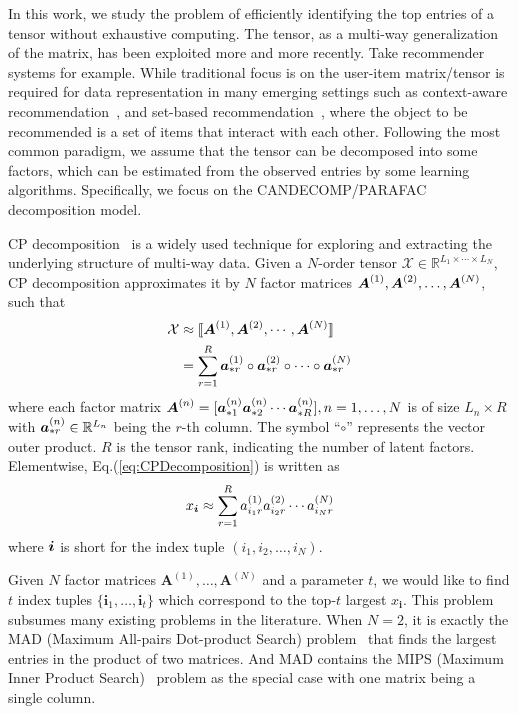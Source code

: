 \documentclass[letterpaper]{article}
\newcommand{\Sca}[3]{{#1}^{(#2)}_{i_#2#3}}%
\newcommand{\anr}[2]{\Sca{a}{#1}{#2}}
\newcommand{\T}[1]{\mathcal{#1}}
\newcommand{\KT}[1]{\llbracket #1 \rrbracket}
\newcommand{\V}[1]{{\boldsymbol{{\MakeLowercase{#1}}}}}
\newcommand{\ColVec}[3]{\V{#1}^{(#2)}_{#3}}
\newcommand{\ColVecA}[1]{\V{a}^{(#1)}_{*r}}
\newcommand{\M}[1]{{\boldsymbol{{\MakeUppercase{#1}}}}}
\newcommand{\FacMat}[2]{\M{#1}^{(#2)}}
\newcommand{\Eqn}[1]{Eq.(\ref{eq:#1})}
\begin{document}
In this work, 
we study the problem of efficiently identifying the top entries of a tensor 
without exhaustive computing. 
The tensor, as a multi-way generalization of the matrix, 
has been exploited more and more recently. 
Take recommender systems for example. 
While traditional focus is on the user-item matrix/tensor 
is required for data representation in many emerging settings 
such as context-aware recommendation~\cite{Rendle_PITF,KoYe09}, 
and set-based recommendation~\cite{HuYiLa15},
where the object to be recommended is a set of items that interact with each other. 
Following the most common paradigm, we assume that the tensor can be decomposed into some factors, 
which can be estimated from the observed entries by some learning algorithms. 
Specifically, we focus on the CANDECOMP/PARAFAC decomposition model.

CP decomposition~\cite{KoBa09} is a widely used technique for exploring and 
extracting the underlying structure of multi-way data. 
Given a $N$-order tensor $\T{X}\in\mathbb{R}^{L_1\times \cdots\times L_N}$, 
CP decomposition approximates it by $N$ factor matrices $\FacMat{A}{1},\FacMat{A}{2},\ldots,\FacMat{A}{N}$, 
such that
\begin{align}
\label{eq:CPDecomposition}
\T{X}&\approx\KT{\FacMat{A}{1},\FacMat{A}{2},\cdots,\FacMat{A}{N}} \\ \notag
&=\sum_{r=1}^R\ColVecA{1}\circ\ColVecA{2}\circ\cdots\circ\ColVecA{N}
\end{align}
where each factor matrix 
$\FacMat{A}{n}=[\ColVec{a}{n}{*1}\ColVec{a}{n}{*2}\cdots\ColVec{a}{n}{*R}], n=1,\ldots,N$
is of size $L_n\times R$ with $\ColVec{a}{n}{*r}\in\mathbb{R}^{L_n}$ 
being the $r$-th column.
The symbol ``$\circ$'' represents the vector outer product. 
$R$ is the tensor rank, indicating the number of latent factors. 
Elementwise, \Eqn{CPDecomposition} is written as
\begin{align}
\label{eq:CPValue}
x_\V{i} \approx \sum_{r=1}^{R}\anr{1}{r}\anr{2}{r}\cdots\anr{N}{r}
\end{align}
where $\V{i}$ is short for the index tuple $(i_1,i_2,\ldots,i_N)$.

Given $N$ factor matrices $\textbf{A}^{(1)},\ldots,\textbf{A}^{(N)}$ and a parameter $t$, 
we would like to find $t$ index tuples $\{\boldsymbol{i}_1,\ldots,\boldsymbol{i}_t\}$ 
which correspond to the top-$t$ largest $x_{\boldsymbol{i}}$.
This problem subsumes many existing problems in the literature.
When $N=2$, it is exactly the MAD (Maximum All-pairs Dot-product Search) problem~\cite{BaPiKoSe15}
that finds the largest entries in the product of two matrices. 
And MAD contains the MIPS (Maximum Inner Product Search)~\cite{Cohen97} problem 
as the special case with one matrix being a single column.
\end{document}
